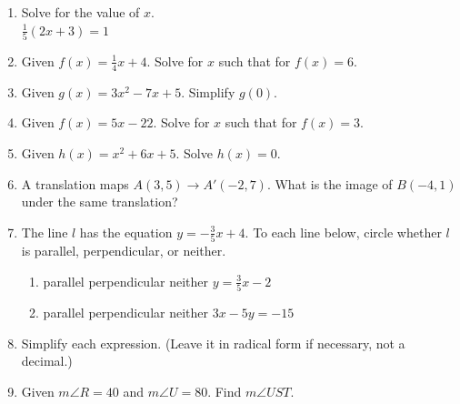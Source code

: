 \documentclass[12pt, twoside]{article}
\begin{document}
\begin{enumerate}
\newpage
\item   Solve for the value of $x$.\\[0.5cm]
$\frac{1}{5}(2x+3)=1$ \vspace{3cm}

\item Given $f(x)=\frac{1}{4} x+4$. Solve for $x$ such that for $f(x)=6$. \vspace{3.5cm}
\item Given $g(x)=3x^2-7x+5$. Simplify $g(0)$. \vspace{2cm}
\item Given $f(x)=5x-22$. Solve for $x$ such that for $f(x)=3$. \vspace{3.5cm}
\item Given $h(x)=x^2+6x+5$. Solve $h(x)=0$. \vspace{3cm}

\newpage
\item A translation maps $A(3,5) \rightarrow A'(-2,7)$. What is the image of $B(-4,1)$ under the same translation?  \vspace{1.5cm}

\item The line $l$ has the equation $y=-\frac{3}{5}x+4$. To each line below, circle whether $l$ is parallel, perpendicular, or neither.
  \begin{enumerate}
    \item parallel \quad perpendicular \quad neither \qquad $y=\frac{3}{5}x-2$
    \vspace{0.5cm}
    \item parallel \quad perpendicular \quad neither \qquad $3x-5y=-15$
    \vspace{2.5cm}
  \end{enumerate}

\item Simplify each expression. (Leave it in radical form if necessary, not a decimal.)
  \begin{enumerate}
  \end{enumerate} \vspace{2cm}


\item Given $m\angle R=40$ and $m\angle U=80$. Find $m\angle UST$.\\[1cm]
 \vspace{1cm}


\end{enumerate}
\end{document}
